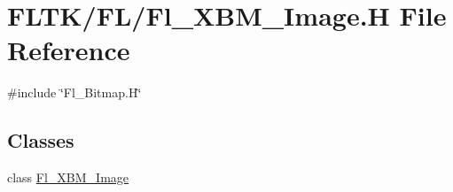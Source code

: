 \hypertarget{_fl___x_b_m___image_8_h}{}\section{F\+L\+T\+K/\+F\+L/\+Fl\+\_\+\+X\+B\+M\+\_\+\+Image.H File Reference}
\label{_fl___x_b_m___image_8_h}
{\ttfamily \#include \char`\"{}Fl\+\_\+\+Bitmap.\+H\char`\"{}}\newline
\subsection*{Classes}
\begin{DoxyCompactItemize}
\item 
class \hyperlink{class_fl___x_b_m___image}{Fl\+\_\+\+X\+B\+M\+\_\+\+Image}
\end{DoxyCompactItemize}

